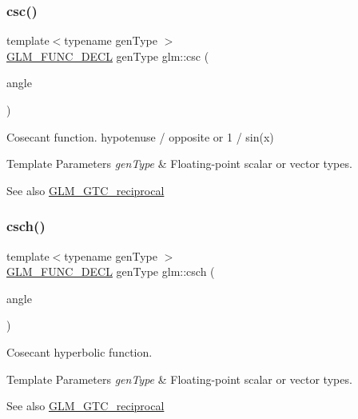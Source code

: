 \subsubsection{\texorpdfstring{csc()}{csc()}}
{\footnotesize\ttfamily template$<$typename gen\+Type $>$ \\
\mbox{\hyperlink{setup_8hpp_ab2d052de21a70539923e9bcbf6e83a51}{G\+L\+M\+\_\+\+F\+U\+N\+C\+\_\+\+D\+E\+CL}} gen\+Type glm\+::csc (\begin{DoxyParamCaption}\item[{gen\+Type}]{angle }\end{DoxyParamCaption})}

Cosecant function. hypotenuse / opposite or 1 / sin(x)


\begin{DoxyTemplParams}{Template Parameters}
{\em gen\+Type} & Floating-\/point scalar or vector types.\\
\hline
\end{DoxyTemplParams}
\begin{DoxySeeAlso}{See also}
\mbox{\hyperlink{group__gtc__reciprocal}{G\+L\+M\+\_\+\+G\+T\+C\+\_\+reciprocal}} 
\end{DoxySeeAlso}
\mbox{\label{group__gtc__reciprocal_ga6d95843ff3ca6472ab399ba171d290a0}} 
\subsubsection{\texorpdfstring{csch()}{csch()}}
{\footnotesize\ttfamily template$<$typename gen\+Type $>$ \\
\mbox{\hyperlink{setup_8hpp_ab2d052de21a70539923e9bcbf6e83a51}{G\+L\+M\+\_\+\+F\+U\+N\+C\+\_\+\+D\+E\+CL}} gen\+Type glm\+::csch (\begin{DoxyParamCaption}\item[{gen\+Type}]{angle }\end{DoxyParamCaption})}

Cosecant hyperbolic function.


\begin{DoxyTemplParams}{Template Parameters}
{\em gen\+Type} & Floating-\/point scalar or vector types.\\
\hline
\end{DoxyTemplParams}
\begin{DoxySeeAlso}{See also}
\mbox{\hyperlink{group__gtc__reciprocal}{G\+L\+M\+\_\+\+G\+T\+C\+\_\+reciprocal}} 
\end{DoxySeeAlso}
\mbox{\label{group__gtc__reciprocal_gae4bcbebee670c5ea155f0777b3acbd84}} 
